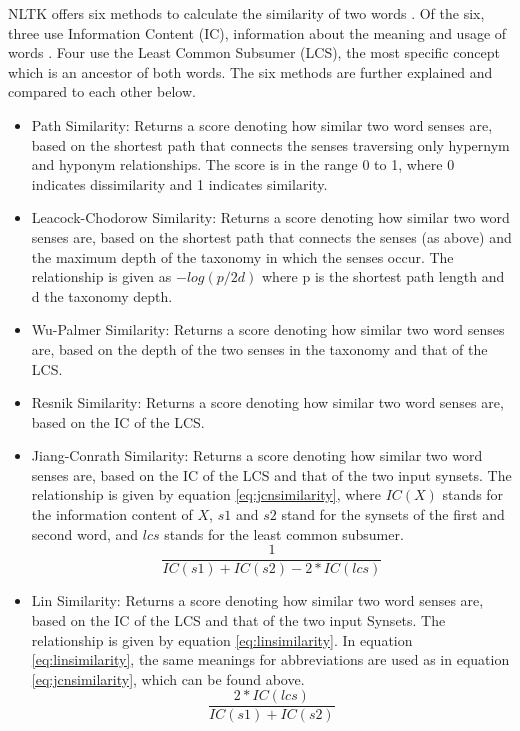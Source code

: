 \documentclass{article}
\begin{document}
NLTK offers six methods to calculate the similarity of two words \citep{pedersen2004wordnet}. Of the six, three use Information Content (IC), information about the meaning and usage of words \cite{seco2004intrinsic}. Four use the Least Common Subsumer (LCS), the most specific concept which is an ancestor of both words. The six methods are further explained and compared to each other below.
\begin{itemize}
	\item Path Similarity: Returns a score denoting how similar two word senses are, based on the shortest path that connects the senses traversing only hypernym and hyponym relationships. The score is in the range 0 to 1, where 0 indicates dissimilarity and 1 indicates similarity.
	\item Leacock-Chodorow Similarity: Returns a score denoting how similar two word senses are, based on the shortest path that connects the senses (as above) and the maximum depth of the taxonomy in which the senses occur. The relationship is given as \(-log(p/2d)\) where p is the shortest path length and d the taxonomy depth. %
	\item Wu-Palmer Similarity: Returns a score denoting how similar two word senses are, based on the depth of the two senses in the taxonomy and that of the LCS.
	\item Resnik Similarity: Returns a score denoting how similar two word senses are, based on the IC of the LCS.
	\item Jiang-Conrath Similarity: Returns a score denoting how similar two word senses are, based on the IC of the LCS and that of the two input synsets. The relationship is given by equation \ref{eq:jcnsimilarity}, where $IC(X)$ stands for the information content of $X$, $s1$ and $s2$ stand for the synsets of the first and second word, and $lcs$ stands for the least common subsumer.
\begin{equation} \label{eq:jcnsimilarity}
	\frac{1} {IC(s1) + IC(s2) - 2 * IC(lcs)}
\end{equation}
	\item Lin Similarity: Returns a score denoting how similar two word senses are, based on the IC of the LCS and that of the two input Synsets. The relationship is given by equation \ref{eq:linsimilarity}. In equation \ref{eq:linsimilarity}, the same meanings for abbreviations are used as in equation \ref{eq:jcnsimilarity}, which can be found above.
\begin{equation} \label{eq:linsimilarity}
	\frac{2 * IC(lcs)} {IC(s1) + IC(s2)} 
\end{equation} 
\end{itemize}
\end{document}
